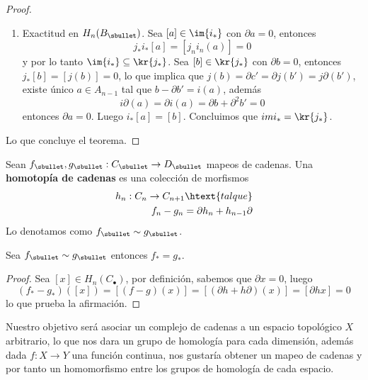 \documentclass{article}
\begin{document}
\begin{proof}
\begin{enumerate}
        \item Exactitud en $H_{n}(B_{\sbullet})$. Sea $[a]\in\im{i_{*}}$ con $\partial a=0$, 
        entonces
        \begin{equation*}
            j_{*}i_{*}[a]=[j_{n}i_{n}(a)]=0
        \end{equation*}
        y por lo tanto $\im{i_{*}}\subseteq\kr{j_{*}}$. Sea $[b]\in\kr{j_{*}}$ con 
        $\partial b=0$, entonces $j_{*}[b]=[j(b)]=0$, lo que implica que $j(b)=\partial c'
        =\partial j(b')=j\partial(b')$, existe único $a\in A_{n-1}$ tal que $b-\partial b'=i(a)$,
        además
        \begin{equation*}
            i\partial(a)=\partial i(a)=\partial b+\partial^{2}b'=0
        \end{equation*}
        entonces $\partial a=0$. Luego $i_{*}[a]=[b]$. Concluimos que $im{i_{*}}=\kr{j_{*}}$.
    \end{enumerate}
    Lo que concluye el teorema.
\end{proof}

\begin{dfn}
    Sean $f_{\sbullet},g_{\sbullet}:C_{\sbullet}\to D_{\sbullet}$ mapeos de cadenas. Una 
    \textbf{homotopía de cadenas} es una colección de morfismos
    \begin{align*}
        h_{n}:C_{n}\to C_{n+1}\htext{tal que} \\
        f_{n}-g_{n}=\partial h_{n}+h_{n-1}\partial
    \end{align*}
    Lo denotamos como $f_{\sbullet}\sim g_{\sbullet}$.
\end{dfn}

\begin{prop}
    Sea $f_{\sbullet}\sim g_{\sbullet}$ entonces $f_{*}=g_{*}$.
\end{prop}
\begin{proof}
    Sea $[x]\in H_{n}(C_{\bullet})$, por definición, sabemos que $\partial x=0$, luego
    \begin{equation*}
        (f_{*}-g_{*})([x])=[(f-g)(x)]=[(\partial h+h\partial)(x)]=[\partial hx]=0
    \end{equation*}
    lo que prueba la afirmación.
\end{proof}

\vspace{2mm}
\noindent Nuestro objetivo será asociar un complejo de cadenas a un espacio topológico $X$ 
arbitrario, lo que nos dara un grupo de homología para cada dimensión, además dada $f:X\to Y$ una
función continua, nos gustaría obtener un mapeo de cadenas y por tanto un homomorfismo entre los
grupos de homología de cada espacio.
\end{document}
